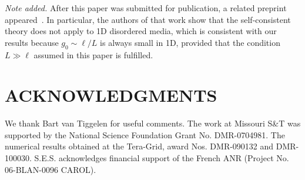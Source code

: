 \textit{Note added.}
After this paper was submitted for publication, a related preprint appeared~\cite{2010_Tian_PRL}. In particular, the authors of that work show that the self-consistent theory does not apply to 1D disordered media, which is consistent with our results because $g_0 \sim \ell/L$ is always small in 1D, provided that the condition $L \gg \ell$ assumed in this paper is fulfilled.

\section{ACKNOWLEDGMENTS}

We thank Bart van Tiggelen for useful comments. The work at Missouri S\&T was supported by the National Science Foundation Grant No. DMR-0704981. The numerical results obtained at the Tera-Grid, award Nos. DMR-090132 and DMR-100030. S.E.S. acknowledges financial support of the French ANR (Project No. 06-BLAN-0096 CAROL).
